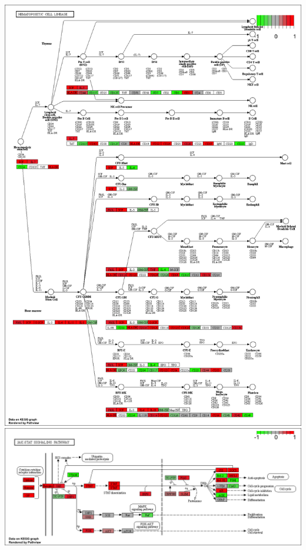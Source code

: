 \documentclass[
]{article}
\begin{document}
\includegraphics{hsa04640.pathview.png}
\includegraphics{hsa04630.pathview.png}
\end{document}
